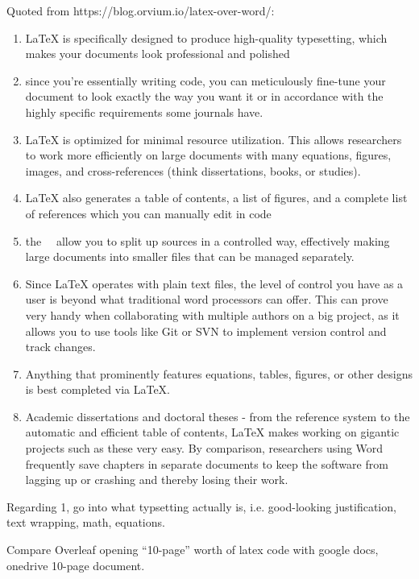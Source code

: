 \documentclass[12pt]{article}
\begin{document}
Quoted from https://blog.orvium.io/latex-over-word/:
\begin{enumerate}
  \item LaTeX is specifically designed to produce high-quality typesetting, which makes your documents look professional and polished
  \item since you’re essentially writing code, you can meticulously fine-tune your document to look exactly the way you want it or in accordance with the highly specific requirements some journals have.
  \item LaTeX is optimized for minimal resource utilization. This allows researchers to work more efficiently on large documents with many equations, figures, images, and cross-references (think dissertations, books, or studies).
  \item LaTeX also generates a table of contents, a list of figures, and a complete list of references which you can manually edit in code
  \item the \ \ allow you to split up sources in a controlled way, effectively making large documents into smaller files that can be managed separately.
  \item Since LaTeX operates with plain text files, the level of control you have as a user is beyond what traditional word processors can offer. This can prove very handy when collaborating with multiple authors on a big project, as it allows you to use tools like Git or SVN to implement version control and track changes.
  \item Anything that prominently features equations, tables, figures, or other designs is best completed via LaTeX.
  \item Academic dissertations and doctoral theses - from the reference system to the automatic and efficient table of contents, LaTeX makes working on gigantic projects such as these very easy. By comparison, researchers using Word frequently save chapters in separate documents to keep the software from lagging up or crashing and thereby losing their work.
\end{enumerate}

Regarding 1, go into what typsetting actually is, i.e. good-looking justification, text wrapping, math, equations.

Compare Overleaf opening ``10-page'' worth of latex code with google docs, onedrive 10-page document.\\
\end{document}
